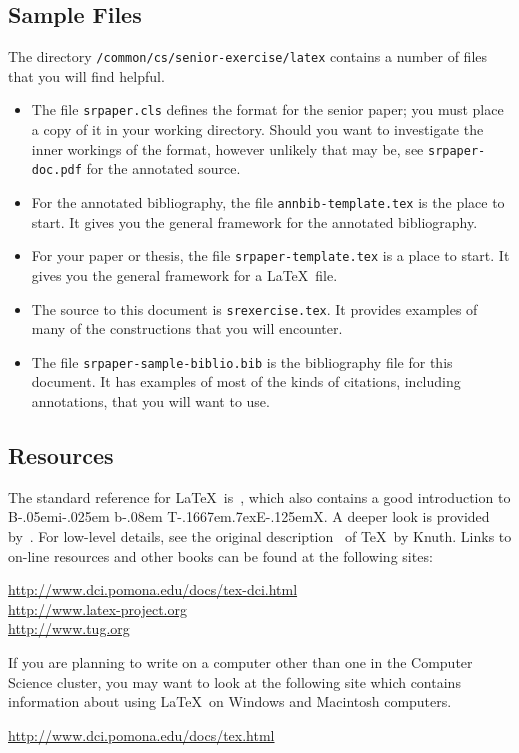 \documentclass[finalcopy]{srpaper}
\def\BibTeX{{\rm B\kern-.05em{\sc i\kern-.025em b}\kern-.08em
    T\kern-.1667em\lower.7ex\hbox{E}\kern-.125emX}}
\begin{document}
\subsection{Sample Files}
The directory \texttt{/common/cs/senior-exercise/latex}%
contains a number of files that you will find helpful.
\begin{itemize}
\item
The file \texttt{srpaper.cls}%
defines the format for
the senior paper; you must place a copy of it in your
working directory. Should you want to investigate the
inner workings of the format, however unlikely that
may be, see \texttt{srpaper-doc.pdf}%
for the annotated source.
\item
For the annotated bibliography, the file
\texttt{annbib-template.tex}%
%
is the place to start. It gives
you the general framework for the annotated bibliography.
\item
For your paper or thesis, the file
\texttt{srpaper-template.tex}%
is a place to start. It gives
you the general framework for a \LaTeX\ file.
\item
The source to this document is \texttt{srexercise.tex}.
It provides examples of many of the constructions that
you will encounter.
\item
The file \texttt{srpaper-sample-biblio.bib}%
%
is the
bibliography file for this document. It has examples of most
of the kinds of citations, including annotations, that you
will want to use.
\end{itemize}

\subsection{Resources}
\label{Subsection:References}
The standard reference for \LaTeX\ is~\cite{Lamport1994},
which also contains a good introduction to \BibTeX. A
deeper look is provided by~\cite{Companion}. For low-level
details, see the original description~\cite{Knuth1984} of
\TeX\ by Knuth. Links to on-line resources and other books
can be found at the following sites:
\begin{indented*}
\url{http://www.dci.pomona.edu/docs/tex-dci.html}\\
\url{http://www.latex-project.org}\\
\url{http://www.tug.org}
\end{indented*}
If you are planning to write on a computer other than 
one in the Computer Science cluster, you may want to 
look at the following site which contains information
about using \LaTeX\ on Windows and Macintosh computers.
\begin{indented*}
\url{http://www.dci.pomona.edu/docs/tex.html}
\end{indented*}
\end{document}
